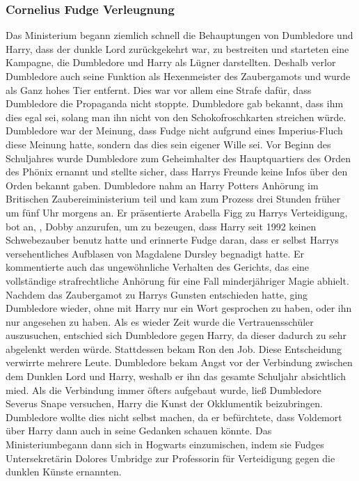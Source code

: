\documentclass[a4paper, 10pt]{article}
\begin{document}
\subsubsection*{Cornelius Fudge Verleugnung}
Das Ministerium begann ziemlich schnell die Behauptungen von Dumbledore und Harry, dass der dunkle Lord zurückgekehrt war, zu bestreiten und starteten eine Kampagne, die Dumbledore und Harry als Lügner darstellten. Deshalb verlor Dumbledore auch seine Funktion als Hexenmeister des Zaubergamots und wurde als Ganz hohes Tier entfernt. Dies war vor allem eine Strafe dafür, dass Dumbledore die Propaganda nicht stoppte. Dumbledore gab bekannt, dass ihm dies egal sei, solang man ihn nicht von den Schokofroschkarten streichen würde. Dumbledore war der Meinung, dass Fudge nicht aufgrund eines Imperius-Fluch diese Meinung hatte, sondern das dies sein eigener Wille sei.
\vspace{10pt}
\newline
{}  
Vor Beginn des Schuljahres wurde Dumbledore zum Geheimhalter des Hauptquartiers des Orden des Phönix ernannt und stellte sicher, dass Harrys Freunde keine Infos über den Orden bekannt gaben.
\vspace{10pt}
\newline
{}  
Dumbledore nahm an Harry Potters Anhörung im Britischen Zaubereiministerium teil und kam zum Prozess drei Stunden früher um fünf Uhr morgens an. Er präsentierte Arabella Figg zu Harrys Verteidigung, bot an, , Dobby anzurufen, um zu bezeugen, dass Harry seit 1992 keinen Schwebezauber benutz hatte und erinnerte Fudge daran, dass er selbst Harrys versehentliches Aufblasen von Magdalene Dursley begnadigt hatte. Er kommentierte auch das ungewöhnliche Verhalten des Gerichts, das eine vollständige strafrechtliche Anhörung für eine Fall minderjähriger Magie abhielt. Nachdem das Zaubergamot zu Harrys Gunsten entschieden hatte, ging Dumbledore wieder, ohne mit Harry nur ein Wort gesprochen zu haben, oder ihn nur angesehen zu haben.
\vspace{10pt}
\newline
{}  
Als es wieder Zeit wurde die Vertrauensschüler auszusuchen, entschied sich Dumbledore gegen Harry, da dieser dadurch zu sehr abgelenkt werden würde. Stattdessen bekam Ron den Job. Diese Entscheidung verwirrte mehrere Leute.
\vspace{10pt}
\newline
{}  
Dumbledore bekam Angst vor der Verbindung zwischen dem Dunklen Lord und Harry, weshalb er ihn das gesamte Schuljahr absichtlich mied. Als die Verbindung immer öfters aufgebaut wurde, ließ Dumbledore Severus Snape versuchen, Harry die Kunst der Okklumentik beizubringen. Dumbledore wollte dies nicht selbst machen, da er befürchtete, dass Voldemort über Harry dann auch in seine Gedanken schauen könnte. Das Ministeriumbegann dann sich in Hogwarts einzumischen, indem sie Fudges Untersekretärin Dolores Umbridge zur Professorin für Verteidigung gegen die dunklen Künste ernannten.
\end{document}
